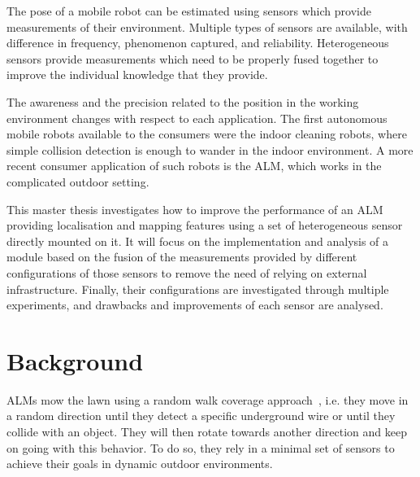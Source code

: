 The pose of a mobile robot can be estimated using sensors which provide measurements of their environment.
Multiple types of sensors are available, with difference in frequency, phenomenon captured, and reliability.
Heterogeneous sensors provide measurements which need to be properly fused together to improve the individual knowledge that they provide.

The awareness and the precision related to the position in the working environment changes with respect to each application.
The first autonomous mobile robots available to the consumers were the indoor cleaning robots, where simple collision detection is enough to wander in the indoor environment.
A more recent consumer application of such robots is the \gls{ALM}, which works in the complicated outdoor setting.

This master thesis investigates how to improve the performance of an \gls{ALM} providing localisation and mapping features using a set of heterogeneous sensor directly mounted on it.
It will focus on the implementation and analysis of a module based on the fusion of the measurements provided by different configurations of those sensors to remove the need of relying on external infrastructure. 
Finally, their configurations are investigated through multiple experiments, and drawbacks and improvements of each sensor are analysed.


\section{Background}
\label{sec:background}


\noindent \gls{ALM}s mow the lawn using a random walk coverage approach~\cite{karol_ardic_conditional_2016}, i.e. they move in a random direction until they detect a specific underground wire or until they collide with an object.
They will then rotate towards another direction and keep on going with this behavior. 
To do so, they rely in a minimal set of sensors to achieve their goals in dynamic outdoor environments.

